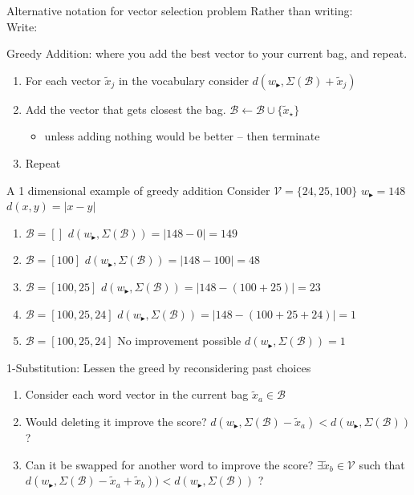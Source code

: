 \documentclass[]{beamer}
\newcommand{\s}{\tilde{s}}
\newcommand{\x}{\tilde{x}}
\newcommand{\V}{\mathcal{V}}
\newcommand{\B}{\mathcal{B}}
\renewcommand{\s}{w_{\blacktriangleright}}
\begin{document}
\begin{frame}{Alternative notation for vector selection problem}
	Rather than writing:\\
	\vectorselectionproblemdefn
	\vfill
	Write:\\
	\vectorselectionproblemdefnalt
	\vfill
\end{frame}


\begin{frame}{Greedy Addition: where you add the best vector to your current bag, and repeat.}
	\vectorselectionproblemdefnalt
	\vfill
	\begin{enumerate}
		\item For each vector $\x_j$ in the vocabulary consider  $d(\s, \Sigma(\B)+\x_j)$
		\item Add the vector that gets closest the bag. $\B\leftarrow\B\cup\{\x_\star\}$
		\begin{itemize}
			\item unless adding nothing would be better -- then terminate
		\end{itemize}
		\item Repeat
	\end{enumerate}
	\vfill
\end{frame}

\begin{frame}{A 1 dimensional example of greedy addition}
	\vectorselectionproblemdefnalt
	\vfill
	Consider $\V=\{24,25,100\}$ \hfill $\s=148$ \hfill $d(x,y)=|x-y|$
	\begin{enumerate}
		\item<1-> $\B=[]$ \hfill $d(\s,\Sigma(\B))=|148-0|=149$ 
		\item<2-> $\B=[100]$ \hfill $d(\s,\Sigma(\B))=|148-100|=48$ 
		\item<3-> $\B=[100,25]$ \hfill $d(\s,\Sigma(\B))=|148-(100+25)|=23$ 
		\item<4-> $\B=[100,25,24]$ \hfill $d(\s,\Sigma(\B))=|148-(100+25+24)|=1$ 
		\item<5-> $\B=[100,25,24]$ \hfill No improvement possible \hfill $d(\s,\Sigma(\B))=1$ 
	\end{enumerate}
	\vfill
	\vfill
\end{frame}

\begin{frame}{1-Substitution: Lessen the greed by reconsidering past choices}
	\vectorselectionproblemdefnalt
	\vfill
	\begin{enumerate}
		\item Consider each word vector in the current bag $\x_a\in\B$
		\item Would deleting it improve the score? $d(\s,\Sigma(\B)-\x_a)<d(\s,\Sigma(\B))$ ?
		\item Can it be swapped for another word to improve the score?
		$\exists \x_b\in\V$ such that
		$d(\s,\Sigma(\B)-\x_a+\x_b))<d(\s,\Sigma(\B))$ ?
	\end{enumerate}
\end{frame}
\end{document}
